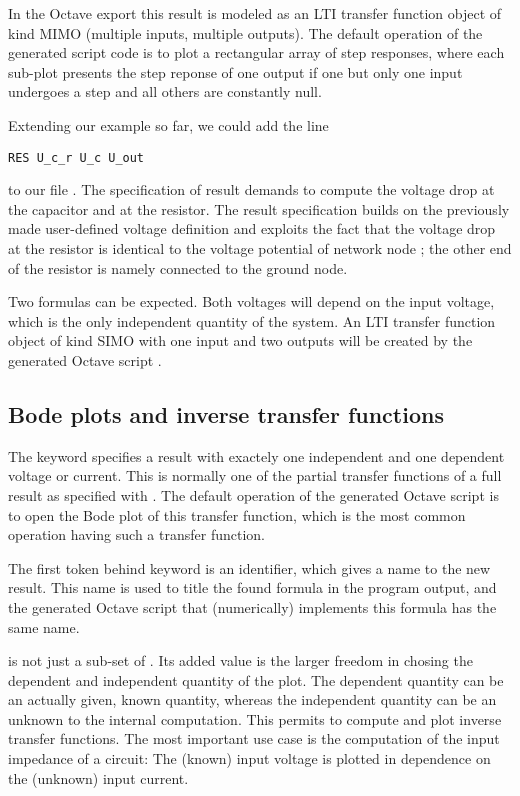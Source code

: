 In the Octave export this result is modeled as an LTI transfer function
object of kind MIMO (multiple inputs, multiple outputs). The default
operation of the generated script code is to plot a rectangular array of
step responses, where each sub-plot presents the step reponse of one
output if one but only one input undergoes a step and all others are
constantly null.

Extending our example so far, we could add the line

\begin{verbatim}
RES U_c_r U_c U_out
\end{verbatim}

\noindent
to our file . The specification of result 
demands to compute the voltage drop at the capacitor and at the resistor.
The result specification builds on the previously made user-defined
voltage definition and exploits the fact that the voltage drop at the
resistor is identical to the voltage potential of network node ;
the other end of the resistor is namely connected to the ground node.

Two formulas can be expected. Both voltages will depend on the input
voltage, which is the only independent quantity of the system. An LTI
transfer function object of kind SIMO with one input and two outputs will
be created by the generated Octave script . 


\subsection{Bode plots and inverse transfer functions}

The keyword  specifies a result with exactely one independent
and one dependent voltage or current. This is normally one of the partial
transfer functions of a full result as specified with . The
default operation of the generated Octave script is to open the Bode plot
of this transfer function, which is the most common operation having such a
transfer function.

The first token behind keyword  is an identifier, which gives a
name to the new result. This name is used to title the found formula in
the program output, and the generated Octave script that (numerically)
implements this formula has the same name.

 is not just a sub-set of . Its added value is the
larger freedom in chosing the dependent and independent quantity of the
plot. The dependent quantity can be an actually given, known quantity,
whereas the independent quantity can be an unknown to the internal
computation. This permits to compute and plot inverse transfer functions.
The most important use case is the computation of the input impedance of a
circuit: The (known) input voltage is plotted in dependence on the
(unknown) input current.

